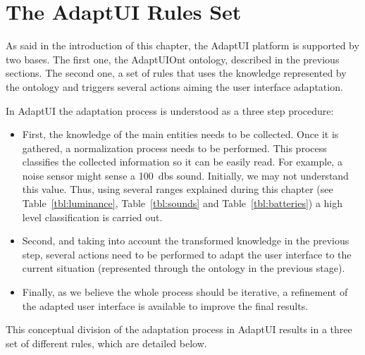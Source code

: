 \section{The AdaptUI Rules Set}
\label{sec:adaptui_rules}

As said in the introduction of this chapter, the AdaptUI platform is supported
by two bases. The first one, the AdaptUIOnt ontology, described in the previous
sections. The second one, a set of rules that uses the knowledge represented
by the ontology and triggers several actions aiming the user interface adaptation.


In AdaptUI the adaptation process is understood as a three step procedure: 

\begin{itemize}
 \item First, the knowledge of the main entities needs to be collected. Once it
 is gathered, a normalization process needs to be performed. This process classifies
 the collected information so it can be easily read. For example, a noise sensor
 might sense a 100~\acp{db} sound. Initially, we may not understand this value. Thus,
 using several ranges explained during this chapter (see Table~\ref{tbl:luminance},
 Table~\ref{tbl:sounds} and Table~\ref{tbl:batteries}) a high level classification
 is carried out.
 
 \item Second, and taking into account the transformed knowledge in the previous
 step, several actions need to be performed to adapt the user interface to the
 current situation (represented through the ontology in the previous stage).
 
 \item Finally, as we believe the whole process should be iterative, a refinement
 of the adapted user interface is available to improve the final results.
\end{itemize}

This conceptual division of the adaptation process in AdaptUI results in a three
set of different rules, which are detailed below.

